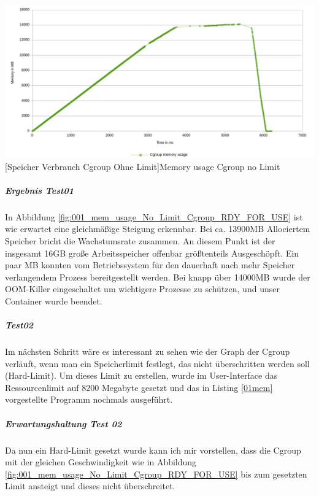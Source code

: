 \vspace{1em}
\begin{minipage}{\linewidth}
	\centering
	\includegraphics[width=1\linewidth]{pics/001_mem_usage_No_Limit_Cgroup_RDY_FOR_USE.png}
	[Speicher Verbrauch Cgroup Ohne Limit]{Memory usage Cgroup no Limit}
	\label{fig:001_mem_usage_No_Limit_Cgroup_RDY_FOR_USE}
\end{minipage}

\subparagraph{Ergebnis Test01}
In Abbildung \ref{fig:001_mem_usage_No_Limit_Cgroup_RDY_FOR_USE} ist wie erwartet eine gleichmäßige Steigung erkennbar. Bei ca. 13900MB Allociertem Speicher bricht die Wachstumsrate zusammen. An diesem Punkt ist der insgesamt 16GB große Arbeitsspeicher offenbar größtenteils Ausgeschöpft. Ein paar MB konnten vom Betriebssystem für den dauerhaft nach mehr Speicher verlangendem Prozess bereitgestellt werden. Bei knapp über 14000MB wurde der OOM-Killer eingeschaltet um wichtigere Prozesse zu schützen, und unser Container wurde beendet.

\subparagraph{Test02}
Im nächsten Schritt wäre es interessant zu sehen wie der Graph der Cgroup verläuft, wenn man ein Speicherlimit festlegt, das nicht überschritten werden soll (Hard-Limit). Um dieses Limit zu erstellen, wurde im User-Interface  das Ressourcenlimit auf 8200 Megabyte gesetzt und das in Listing \ref{01mem} vorgestellte Programm nochmals ausgeführt.

\subparagraph{Erwartungshaltung Test 02}
Da nun ein Hard-Limit gesetzt wurde kann ich mir vorstellen, dass die Cgroup mit der gleichen Geschwindigkeit wie in Abbildung \ref{fig:001_mem_usage_No_Limit_Cgroup_RDY_FOR_USE} bis zum gesetzten Limit ansteigt und dieses nicht überschreitet. 

